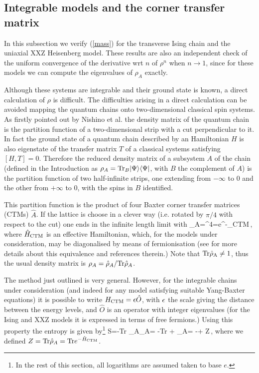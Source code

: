 \documentclass[12pt,aps]{revtex4}
\begin{document}
\subsection{Integrable models and the corner transfer matrix}


In this subsection we verify (\ref{mass})
for the transverse Ising chain and the uniaxial
XXZ Heisenberg model.
These results are also an
independent check of the uniform convergence of the derivative wrt $n$
of $\rho^n$ when $n\rightarrow1$, since for these models we can compute
the eigenvalues of $\rho_A$ exactly.

Although these systems are integrable and their ground state is known, a
direct calculation of $\rho$ is difficult. The difficulties arising in a
direct calculation can be avoided
mapping the quantum chains onto two-dimensional classical spin systems.
As firstly pointed out by Nishino et al. \cite{nishino}
the density matrix of the
quantum chain is the partition function of a two-dimensional strip with a cut
perpendicular to it. In fact the ground state of a quantum chain described
by an Hamiltonian $H$ is also eigenstate of the transfer matrix $T$ of a
classical systems satisfying $[H,T]=0$.
Therefore the reduced density matrix of a subsystem $A$ of the chain (defined
in the Introduction as
$\rho_A={\rm Tr}_B |\Psi\rangle\langle \Psi|$, with
$B$ the complement of $A$) is the
partition function of two half-infinite strips, one extending from $-\infty$
to $0$ and the other from $+\infty$ to 0, with the spins in $B$
identified.

This partition
function is the product of four Baxter corner transfer matrices
(CTMs)\cite{Baxter}
$\hat A$.
If the lattice is choose in a clever way (i.e. rotated by $\pi/4$ with
respect to the cut)
one ends in the infinite length limit with \cite{pkl-99}
\be
\hat{\rho}_A=^4=e^{-_{\rm CTM}}\,,
\ee
where $\hat{H}_{\rm CTM}$ is an effective Hamiltonian, which, for the
models under consideration, may be diagonalised by means
of fermionisation (see for more details about this equivalence
\cite{pkl-99} and references therein.)
Note that ${\rm Tr \hat{\rho}_A \neq 1}$, thus the usual density matrix is
$\rho_A=\hat{\rho}_A/{\rm Tr}\hat{\rho}_A$.

The method just outlined is very general. However, for the
integrable chains under consideration (and indeed for any model
satisfying suitable Yang-Baxter equations\cite{Baxter}) it is
possible to  write $H_{\rm CTM}=\epsilon \hat{O}$, with $\epsilon$ the scale giving the
distance between the energy levels, and $\hat{O}$ is an
operator with integer eigenvalues (for the Ising and XXZ models it is
expressed in terms of free fermions.)
Using this property the entropy is given by\footnote{In the rest of
this section, all logarithms are assumed taken to base $e$.}
\be
S=-{\rm Tr} \rho_A\log\rho_A=
-{\rm Tr} +
\hat{\rho}_A=
-\e{}+ \log Z\,,
\label{entrint}
\ee
where we defined $Z={\rm Tr} \hat{\rho}_A={\rm Tr} e^{-\hat{H}_{\rm CTM}}$.
\end{document}
